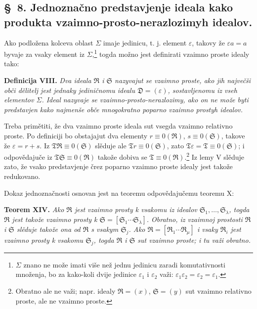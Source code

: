 \documentclass[11pt]{article}
\newcommand{\ideal}[1]{\mathfrak{#1}}
\begin{document}

\setcounter{footnote}{30}
\subsection*{\S~8. Jednoznačno predstavjenje ideala kako produkta vzaimno-prosto-nerazlozimyh idealov.}

Ako podložena kolceva oblast \(\Sigma\) imaje jedinicu, t. j. element \(\varepsilon\), takovy že \(\varepsilon a=a\) byvaje za vsaky element iz \(\Sigma\),\footnote{\(\Sigma\) znano ne može imati više než jednu jedinicu zaradi komutativnosti množenja, bo za kako-koli dvije jedinice \(\varepsilon_1\) i \(\varepsilon_2\) važi: \(\varepsilon_1\varepsilon_2=\varepsilon_2=\varepsilon_1\).} togda možno jest definirati vzaimno proste idealy tako:

\textbf{Definicija VIII.} \emph{Dva ideala \(\ideal R\) i \(\ideal S\) nazyvajut se vzaimno proste, ako jih največši obči dělitelj jest jednaky jediničnomu idealu \(\ideal D=(\varepsilon)\), sostavljenomu iz vseh elementov \(\Sigma\). Ideal nazyvaje se vzaimno-prosto-nerazlozimy, ako on ne može byti predstavjen kako najmenše obče mnogokratno poparno vzaimno prostyh idealov.}

Treba primětiti, že dva vzaimno proste ideala sut vsegda vzaimno relativno proste. Po definiciji bo obstajajut dva elementy \(r\equiv0(\ideal R)\), \(s\equiv0(\ideal S)\), takove že \(\varepsilon=r+s\). Iz \(\ideal T\ideal R\equiv0(\ideal S)\) slěduje ale \(\ideal T r\equiv0(\ideal S)\), zato \(\ideal T\varepsilon=\ideal T\equiv0(\ideal S)\); i odpovědajuče iz \(\ideal T\ideal S\equiv0(\ideal R)\) takože dobiva se \(\ideal T\equiv0(\ideal R)\).\footnote{Obratno ale ne važi; napr. idealy \(\ideal R=(x)\), \(\ideal S=(y)\) sut vzaimno relativno proste, ale ne vzaimno proste.} Iz lemy V slěduje zato, že vsako predstavjenje črez poparno vzaimno proste idealy jest takože redukovano.

Dokaz jednoznačnosti osnovan jest na teoremu odpovědajučemu teoremu X:

\textbf{Teorem XIV.} \emph{Ako \(\ideal R\) jest vzaimno prosty k vsakomu iz idealov \(\ideal S_1,\ldots,\ideal S_\lambda\), togda \(\ideal R\) jest takože vzaimno prosty k \(\ideal S=[\ideal S_1\cdots\ideal S_\lambda]\). Obratno, iz vzaimnoj prostosti \(\ideal R\) i \(\ideal S\) slěduje takože ona od \(\ideal R\) s vsakym \(\ideal S_j\). Ako \(\ideal R=[\ideal R_1\cdots\ideal R_\mu]\) i vsaky \(\ideal R_i\) jest vzaimno prosty k vsakomu \(\ideal S_j\), togda \(\ideal R\) i \(\ideal S\) sut vzaimno proste; i tu važi obratno.}
\end{document}
